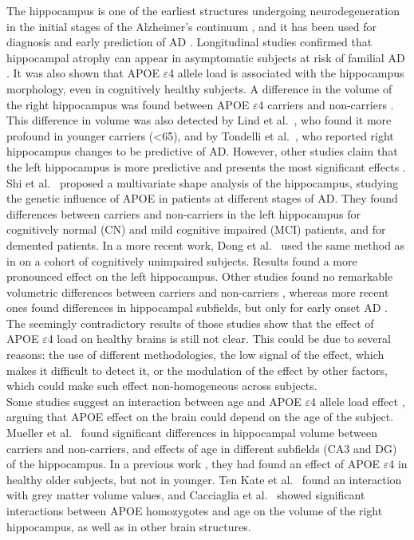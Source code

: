 The hippocampus is one of the earliest structures undergoing neurodegeneration in the initial stages of the Alzheimer's continuum \cite{Pievani2011}, and it has been used for diagnosis and early prediction of AD \cite{Sanroma2017}. Longitudinal studies confirmed that hippocampal atrophy can appear in asymptomatic subjects at risk of familial AD \cite{Fox1996}. It was also shown that APOE $\varepsilon$4 allele load is associated with the hippocampus morphology, even in cognitively healthy subjects. A difference in the volume of the right hippocampus was found between APOE $\varepsilon$4 carriers and non-carriers \cite{ODwyer2012}. This difference in volume was also detected by Lind et al.\ \cite{Lind2006}, who found it more profound in younger carriers (<65), and by Tondelli et al.\ \cite{Tondelli2012}, who reported right hippocampus changes to be predictive of AD. However, other studies claim that the left hippocampus is more predictive and presents the most significant effects \cite{Csernansky2005}. Shi et al.\ \cite{Shi2014} proposed a multivariate shape analysis of the hippocampus, studying the genetic influence of APOE in patients at different stages of AD. They found differences between carriers and non-carriers in the left hippocampus for cognitively normal (CN) and mild cognitive impaired (MCI) patients, and for demented patients. In a more recent work, Dong et al.\ \cite{Dong2019} used the same method as in \cite{Shi2014} on a cohort of cognitively unimpaired subjects. Results found a more pronounced effect on the left hippocampus. Other studies found no remarkable volumetric differences between carriers and non-carriers \cite{Hostage2013,Protas2013}, whereas more recent ones found differences in hippocampal subfields, but only for early onset AD \cite{Parker2019}. The seemingly contradictory results of those studies show that the effect of APOE $\varepsilon$4 load on healthy brains is still not clear. This could be due to several reasons: the use of different methodologies, the low signal of the effect, which makes it difficult to detect it, or the modulation of the effect by other factors, which could make such effect non-homogeneous across subjects. \\

Some studies suggest an interaction between age and APOE $\varepsilon$4 allele load effect \cite{Tuminello2011}, arguing that APOE effect on the brain could depend on the age of the subject. Mueller et al.\ \cite{Mueller2009} found significant differences in hippocampal volume between carriers and non-carriers, and effects of age in different subfields (CA3 and DG) of the hippocampus. In a previous work \cite{Mueller2008}, they had found an effect of APOE $\varepsilon$4 in healthy older subjects, but not in younger. Ten Kate et al.\ \cite{TenKate2016} found an interaction with grey matter volume values, and Cacciaglia et al.\ \cite{Cacciaglia2018} showed significant interactions between APOE homozygotes and age on the volume of the right hippocampus, as well as in other brain structures. \\

